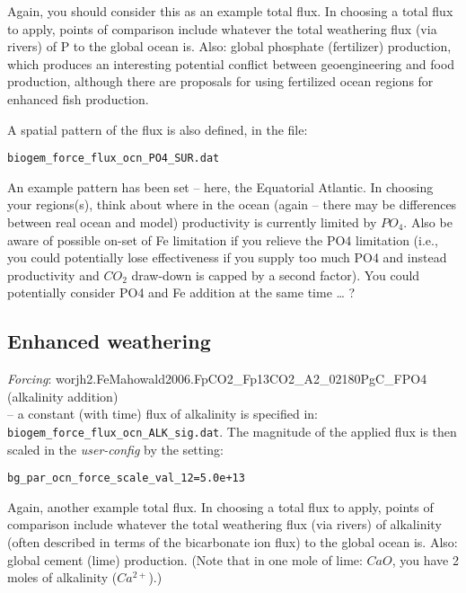 \documentclass[11pt,fleqn]{book} %
\begin{document}
Again, you should consider this as an example total flux. In choosing a total flux to apply, points of comparison include whatever the total weathering flux (via rivers) of P to the global ocean is. Also: global phosphate (fertilizer) production, which produces an interesting potential conflict between geoengineering and food production, although there are proposals for using fertilized ocean regions for enhanced fish production.

A spatial pattern of the flux is also defined, in the file:
\vspace{-2pt}\small\begin{verbatim}
biogem_force_flux_ocn_PO4_SUR.dat
\end{verbatim}\normalsize\vspace{-2pt}

An example pattern has been set – here, the Equatorial Atlantic. In choosing your regions(s), think about where in the ocean (again – there may be differences between real ocean and model) productivity is currently limited by \(PO_{4}\). Also be aware of possible on-set of Fe limitation if you relieve the PO4 limitation (i.e., you could potentially lose effectiveness if you supply too much PO4 and instead productivity and \(CO_{2}\) draw-down is capped by a second factor). You could potentially consider PO4 and Fe addition at the same time … ?


\subsection{Enhanced weathering}

\textit{Forcing}: \textsf{\footnotesize worjh2.FeMahowald2006.FpCO2\_Fp13CO2\_A2\_02180PgC\_FPO4} (alkalinity addition)
\vspace{1pt}
\\ -- a constant (with time) flux of alkalinity is specified in: \texttt{biogem\_force\_flux\_ocn\_ALK\_sig.dat}. The magnitude of the applied flux is then scaled in the \textit{user-config} by the setting:
\vspace{-2pt}\small\begin{verbatim}
bg_par_ocn_force_scale_val_12=5.0e+13
\end{verbatim}\normalsize\vspace{-2pt}

Again, another example total flux. In choosing a total flux to apply, points of comparison include whatever the total weathering flux (via rivers) of alkalinity (often described in terms of the bicarbonate ion flux) to the global ocean is. Also: global cement (lime) production. (Note that in one mole of lime: \(CaO\), you have 2 moles of alkalinity (\(Ca^{2+}\)).)
\end{document}
